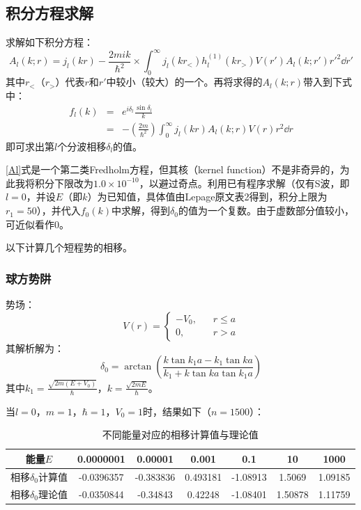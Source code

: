 \documentclass[hyperref,cs4size,titlepage,twoside]{ctexart}
\begin{document}
\subsection{积分方程求解}
求解如下积分方程：
\begin{equation}\label{Al}
  A_l(k;r)=j_l(kr)-\frac{2mik}{\hbar^2}\times\int_{0}^{\infty}j_l(kr_<)h^{(1)}_l(kr_>)V(r')A_l(k;r')r'^2\dd r'
\end{equation}
其中$r_<$（$r_>$）代表$r$和$r'$中较小（较大）的一个。再将求得的$A_l(k;r)$带入到下式中：
\begin{eqnarray}
  f_l(k) &=& e^{i\delta_l}\frac{\sin \delta_l}{k} \\
   &=& -(\frac{2m}{\hbar^2})\int_{0}^{\infty}j_l(kr)A_l(k;r)V(r)r^2\dd r
\end{eqnarray}
即可求出第$l$个分波相移$\delta_l$的值。

\eqref{Al}式是一个第二类Fredholm方程，但其核（kernel function）不是非奇异的，为此我将积分下限改为$1.0\times10^{-10}$，以避过奇点。利用已有程序求解（仅有S波，即$l=0$，并设$E$（即$k$）为已知值，具体值由Lepage原文表2得到，积分上限为$r_1=50$），并代入$f_0(k)$中求解，得到$\delta_0$的值为一个复数。由于虚数部分值较小，可近似看作$0$。

以下计算几个短程势的相移。
\subsubsection{球方势阱}
势场：
\begin{equation}\label{sq}
  V(r)=
\begin{cases}
  -V_0, & \;\;\;r\leq a \\
  0, &  \;\;\;r>a
\end{cases}
\end{equation}
其解析解为：
\begin{equation}\label{s}
  \delta_0=\arctan(\frac{k \tan k_1a-k_1\tan ka}{k_1+k\tan ka \tan k_1a})
\end{equation}
其中$\displaystyle k_1=\frac{\sqrt{2m(E+V_0)}}{\hbar}$，$\displaystyle k=\frac{\sqrt{2mE}}{\hbar}$。

当$l=0$，$m=1$，$\hbar=1$，$V_0=1$时，结果如下（$n=1500$）：
\begin{table}[!htbp]
  \centering
  \begin{tabular}{|c|c|c|c|c|c|c|}
    \hline
    能量$E$ &0.0000001&0.00001& 0.001 & 0.1 & 10 & 1000\\\hline
    相移$\delta_0$计算值 &-0.0396357&-0.383836& 0.493181  & -1.08913 & 1.5069 & 1.09185  \\\hline
    相移$\delta_0$理论值 &-0.0350844&-0.34843& 0.42248 & -1.08401 & 1.50878 & 1.11759  \\\hline
  \end{tabular}
  \caption{不同能量对应的相移计算值与理论值}\label{sqq}
\end{table}
\end{document}
